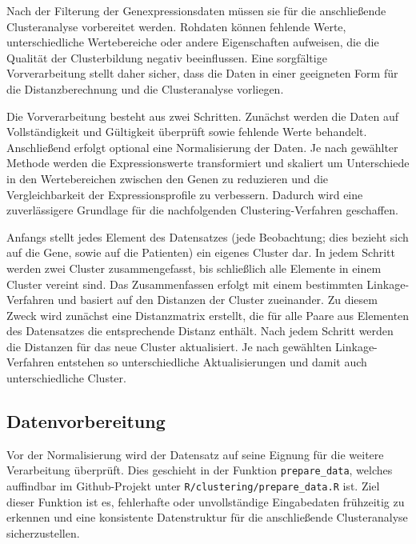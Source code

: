 \documentclass[12pt]{article}
\begin{document}
Nach der Filterung der Genexpressionsdaten müssen sie für die anschließende Clusteranalyse vorbereitet werden. Rohdaten können fehlende Werte, unterschiedliche Wertebereiche oder andere Eigenschaften aufweisen, die die Qualität der Clusterbildung negativ beeinflussen. Eine sorgfältige Vorverarbeitung stellt daher sicher, dass die Daten in einer geeigneten Form für die Distanzberechnung und die Clusteranalyse vorliegen.

Die Vorverarbeitung besteht aus zwei Schritten. Zunächst werden die Daten auf Vollständigkeit und Gültigkeit überprüft sowie fehlende Werte behandelt. Anschließend erfolgt optional eine Normalisierung der Daten. Je nach gewählter Methode werden die Expressionswerte transformiert und skaliert um Unterschiede in den Wertebereichen zwischen den Genen zu reduzieren und die Vergleichbarkeit der Expressionsprofile zu verbessern. Dadurch wird eine zuverlässigere Grundlage für die nachfolgenden Clustering-Verfahren geschaffen.

Anfangs stellt jedes Element des Datensatzes (jede Beobachtung; dies bezieht sich auf die Gene, sowie auf die Patienten) ein eigenes Cluster dar. In jedem Schritt werden zwei Cluster zusammengefasst, bis schließlich alle Elemente in einem Cluster vereint sind. Das Zusammenfassen erfolgt mit einem bestimmten Linkage-Verfahren und basiert auf den Distanzen der Cluster zueinander. Zu diesem Zweck wird zunächst eine Distanzmatrix erstellt, die für alle Paare aus Elementen des Datensatzes die entsprechende Distanz enthält. Nach jedem Schritt werden die Distanzen für das neue Cluster aktualisiert. Je nach gewählten Linkage-Verfahren entstehen so unterschiedliche Aktualisierungen und damit auch unterschiedliche Cluster.

\newpage
\pagestyle{fancy}
\fancyhead{}

\subsection{Datenvorbereitung}
\label{datenvorbereitung}

Vor der Normalisierung wird der Datensatz auf seine Eignung für die weitere Verarbeitung überprüft. Dies geschieht in der Funktion \texttt{prepare\_data}, welches auffindbar im Github-Projekt unter \texttt{R/clustering/prepare\_data.R} ist. Ziel dieser Funktion ist es, fehlerhafte oder unvollständige Eingabedaten frühzeitig zu erkennen und eine konsistente Datenstruktur für die anschließende Clusteranalyse sicherzustellen.
\end{document}
